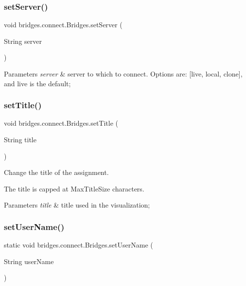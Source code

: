 \subsubsection{\texorpdfstring{setServer()}{setServer()}}
{\footnotesize\ttfamily void bridges.\+connect.\+Bridges.\+set\+Server (\begin{DoxyParamCaption}\item[{String}]{server }\end{DoxyParamCaption})}


\begin{DoxyParams}{Parameters}
{\em server} & server to which to connect. Options are\+: \mbox{[}\textquotesingle{}live\textquotesingle{}, \textquotesingle{}local\textquotesingle{}, \textquotesingle{}clone\textquotesingle{}\mbox{]}, and \textquotesingle{}live\textquotesingle{} is the default; \\
\hline
\end{DoxyParams}
\mbox{\label{classbridges_1_1connect_1_1_bridges_aed3752ee6318a48dff271d9a9e2a8fcc}} 
\subsubsection{\texorpdfstring{setTitle()}{setTitle()}}
{\footnotesize\ttfamily void bridges.\+connect.\+Bridges.\+set\+Title (\begin{DoxyParamCaption}\item[{String}]{title }\end{DoxyParamCaption})}



Change the title of the assignment. 

The title is capped at Max\+Title\+Size characters.


\begin{DoxyParams}{Parameters}
{\em title} & title used in the visualization; \\
\hline
\end{DoxyParams}
\mbox{\label{classbridges_1_1connect_1_1_bridges_af9b9a2ca03ba02c0c2be4716594678a6}} 
\subsubsection{\texorpdfstring{setUserName()}{setUserName()}}
{\footnotesize\ttfamily static void bridges.\+connect.\+Bridges.\+set\+User\+Name (\begin{DoxyParamCaption}\item[{String}]{user\+Name }\end{DoxyParamCaption})\hspace{0.3cm}{\ttfamily [static]}}

